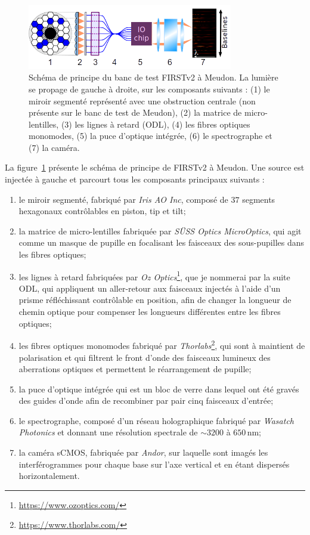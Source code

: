 \begin{figure}[ht!]
    \centering
    \includegraphics[width=0.8\textwidth]{Figure_Chap2/FIRSTv2Scheme_20Outputs_Fringes_b.png}
    \caption[Schéma de principe du banc de test FIRSTv2 à Meudon.]{Schéma de principe du banc de test FIRSTv2 à Meudon. La lumière se propage de gauche à droite, sur les composants suivants : (1) le miroir segmenté représenté avec une obstruction centrale (non présente sur le banc de test de Meudon), (2) la matrice de micro-lentilles, (3) les lignes à retard (ODL), (4) les fibres optiques monomodes, (5) la puce d'optique intégrée, (6) le spectrographe et (7) la caméra.}
    \label{fig:FIRSTv2Scheme}
\end{figure}

La figure~\ref{fig:FIRSTv2Scheme} présente le schéma de principe de \ac{FIRSTv2} à Meudon. Une source est injectée à gauche et parcourt tous les composants principaux suivants :

\begin{enumerate}
    \item le miroir segmenté, fabriqué par \textit{Iris AO Inc}, composé de $37$ segments hexagonaux contrôlables en piston, tip et tilt;
    \item la matrice de micro-lentilles fabriquée par \textit{SÜSS Optics MicroOptics}, qui agit comme un masque de pupille en focalisant les faisceaux des sous-pupilles dans les fibres optiques;
    \item les lignes à retard fabriquées par \textit{Oz Optics}\footnote{\url{https://www.ozoptics.com/}}, que je nommerai par la suite \ac{ODL}, qui appliquent un aller-retour aux faisceaux injectés à l'aide d'un prisme réfléchissant contrôlable en position, afin de changer la longueur de chemin optique pour compenser les longueurs différentes entre les fibres optiques;
    \item les fibres optiques monomodes fabriqué par \textit{Thorlabs}\footnote{\url{https://www.thorlabs.com/}}, qui sont à maintient de polarisation et qui filtrent le front d'onde des faisceaux lumineux des aberrations optiques et permettent le réarrangement de pupille;
    \item la puce d'optique intégrée qui est un bloc de verre dans lequel ont été gravés des guides d'onde afin de recombiner par pair cinq faisceaux d'entrée;
    \item le spectrographe, composé d'un réseau holographique fabriqué par \textit{Wasatch Photonics} et donnant une résolution spectrale de $\sim 3200$ à $650 \,$nm;
    \item la caméra sCMOS, fabriquée par \textit{Andor}, sur laquelle sont imagés les interférogrammes pour chaque base sur l'axe vertical et en étant dispersés horizontalement.
\end{enumerate}

